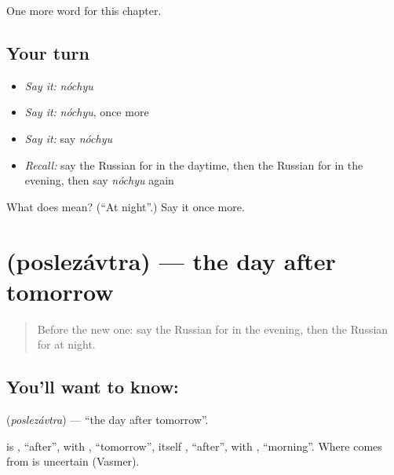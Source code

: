 \begin{grammarlens}[title={What you've built}]
One more word for this chapter.
\end{grammarlens}

\subsection*{Your turn}
\begin{itemize}
\raggedright
  \item \emph{Say it:} \emph{nóchyu}
  \item \emph{Say it:} \emph{nóchyu}, once more
  \item \emph{Say it:} say \emph{nóchyu}
  \item \emph{Recall:} say the Russian for in the daytime, then the Russian for in the evening, then say \emph{nóchyu} again
\end{itemize}

\begin{tcolorbox}[breakable,colback=teal!4,colframe=teal!35!black,title={Before you move on}]
What does  mean? (\textquotedblleft{}At night\textquotedblright{}.) Say it once more.
\end{tcolorbox}
\section[\texorpdfstring{\ru{послезавтра} (poslezávtra)}{послезавтра (poslezávtra)}]{ (poslezávtra) — the day after tomorrow}

\label{lesson:RU-C84-day-after-tomorrow}



\begin{quote}
Before the new one: say the Russian for in the evening, then the Russian for at night.
\end{quote}

\subsection*{You'll want to know: }
\textbf{} (\emph{poslezávtra}) — \textquotedblleft{}the day after tomorrow\textquotedblright{}.

\begin{cousinweb}
\textbf{} is \emph{}, \textquotedblleft{}after\textquotedblright{}, with \emph{}, \textquotedblleft{}tomorrow\textquotedblright{}, itself \emph{}, \textquotedblleft{}after\textquotedblright{}, with \emph{}, \textquotedblleft{}morning\textquotedblright{}. Where \emph{} comes from is uncertain (Vasmer).
\end{cousinweb}

